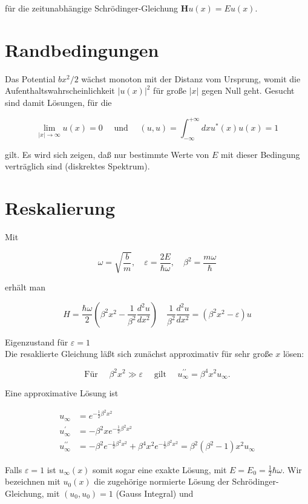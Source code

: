 \documentclass[10pt, letterpaper]{article}
\begin{document}
für die zeitunabhängige Schrödinger-Gleichung $\mathbf{H} u(x)=E u(x)$.

\section*{Randbedingungen}
Das Potential $b x^{2} / 2$ wächst monoton mit der Distanz vom Ursprung, womit die Aufenthaltswahrscheinlichkeit $|u(x)|^{2}$ für große $|x|$ gegen Null geht. Gesucht sind damit Lösungen, für die

$$
\lim _{|x| \rightarrow \infty} u(x)=0 \quad \text { und } \quad(u, u)=\int_{-\infty}^{+\infty} d x u^{*}(x) u(x)=1
$$

gilt. Es wird sich zeigen, daß nur bestimmte Werte von $E$ mit dieser Bedingung verträglich sind (diskrektes Spektrum).

\section*{Reskalierung}
Mit

$$
\omega=\sqrt{\frac{b}{m}}, \quad \varepsilon=\frac{2 E}{\hbar \omega}, \quad \beta^{2}=\frac{m \omega}{\hbar}
$$

erhält man

$$
H=\frac{\hbar \omega}{2}\left(\beta^{2} x^{2}-\frac{1}{\beta^{2}} \frac{d^{2} u}{d x^{2}}\right) \quad \frac{1}{\beta^{2}} \frac{d^{2} u}{d x^{2}}=\left(\beta^{2} x^{2}-\varepsilon\right) u
$$

Eigenzustand für $\varepsilon=1$\\
Die resaklierte Gleichung läßt sich zunächst approximativ für sehr große $x$ lösen:

$$
\text { Für } \quad \beta^{2} x^{2} \gg \varepsilon \quad \text { gilt } \quad u_{\infty}^{\prime \prime}=\beta^{4} x^{2} u_{\infty} \text {. }
$$

Eine approximative Lösung ist

$$
\begin{aligned}
u_{\infty} & =e^{-\frac{1}{2} \beta^{2} x^{2}} \\
u_{\infty}^{\prime} & =-\beta^{2} x e^{-\frac{1}{2} \beta^{2} x^{2}} \\
u_{\infty}^{\prime \prime} & =-\beta^{2} e^{-\frac{1}{2} \beta^{2} x^{2}}+\beta^{4} x^{2} e^{-\frac{1}{2} \beta^{2} x^{2}}=\beta^{2}\left(\beta^{2}-1\right) x^{2} u_{\infty}
\end{aligned}
$$

Falls $\varepsilon=1$ ist $u_{\infty}(x)$ somit sogar eine exakte Lösung, mit $E=E_{0}=\frac{1}{2} \hbar \omega$. Wir bezeichnen mit $u_{0}(x)$ die zugehörige normierte Lösung der Schrödinger-Gleichung, mit $\left(u_{0}, u_{0}\right)=1$ (Gauss Integral) und
\end{document}
